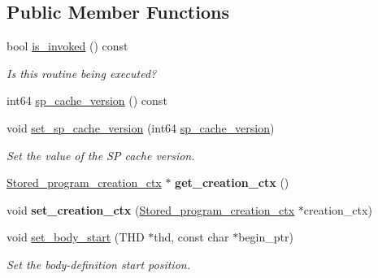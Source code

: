 \subsection*{Public Member Functions}
\begin{DoxyCompactItemize}
\item 
\mbox{\label{classsp__head_a92f33f22ca3e595933c6d8cac926c3db}} 
bool \mbox{\hyperlink{classsp__head_a92f33f22ca3e595933c6d8cac926c3db}{is\+\_\+invoked}} () const
\begin{DoxyCompactList}\small\item\em Is this routine being executed? \end{DoxyCompactList}\item 
int64 \mbox{\hyperlink{classsp__head_a1fbc49e61e66bcee9a00621f806beed2}{sp\+\_\+cache\+\_\+version}} () const
\item 
\mbox{\label{classsp__head_a6f9aa0fc3f66acd5eb86f55c6b6657dd}} 
void \mbox{\hyperlink{classsp__head_a6f9aa0fc3f66acd5eb86f55c6b6657dd}{set\+\_\+sp\+\_\+cache\+\_\+version}} (int64 \mbox{\hyperlink{classsp__head_a1fbc49e61e66bcee9a00621f806beed2}{sp\+\_\+cache\+\_\+version}})
\begin{DoxyCompactList}\small\item\em Set the value of the SP cache version. \end{DoxyCompactList}\item 
\mbox{\label{classsp__head_a5a5916757d63f55ca220987dfa0b7322}} 
\mbox{\hyperlink{classStored__program__creation__ctx}{Stored\+\_\+program\+\_\+creation\+\_\+ctx}} $\ast$ {\bfseries get\+\_\+creation\+\_\+ctx} ()
\item 
\mbox{\label{classsp__head_a03c316c316db8fd1b57ca6cdcfd1e962}} 
void {\bfseries set\+\_\+creation\+\_\+ctx} (\mbox{\hyperlink{classStored__program__creation__ctx}{Stored\+\_\+program\+\_\+creation\+\_\+ctx}} $\ast$creation\+\_\+ctx)
\item 
\mbox{\label{classsp__head_ab529ba0d2ad8ecda32a95f9f3811502d}} 
void \mbox{\hyperlink{classsp__head_ab529ba0d2ad8ecda32a95f9f3811502d}{set\+\_\+body\+\_\+start}} (T\+HD $\ast$thd, const char $\ast$begin\+\_\+ptr)
\begin{DoxyCompactList}\small\item\em Set the body-\/definition start position. \end{DoxyCompactList}\item 

\end{DoxyCompactItemize}
